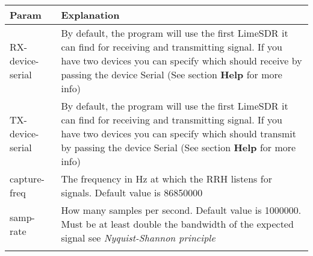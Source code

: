 \begin{longtable}[]{@{}ll@{}}
\toprule
\begin{minipage}[b]{0.18\columnwidth}\raggedright\strut
Param\strut
\end{minipage} & \begin{minipage}[b]{0.18\columnwidth}\raggedright\strut
Explanation\strut
\end{minipage}\tabularnewline
\midrule
\endhead
\begin{minipage}[t]{0.18\columnwidth}\raggedright\strut
RX-device-serial\strut
\end{minipage} & \begin{minipage}[t]{0.18\columnwidth}\raggedright\strut
By default, the program will use the first LimeSDR it can find for
receiving and transmitting signal. If you have two devices you can
specify which should receive by passing the device Serial (See section
\textbf{Help} for more info)\strut
\end{minipage}\tabularnewline
\begin{minipage}[t]{0.18\columnwidth}\raggedright\strut
TX-device-serial\strut
\end{minipage} & \begin{minipage}[t]{0.18\columnwidth}\raggedright\strut
By default, the program will use the first LimeSDR it can find for
receiving and transmitting signal. If you have two devices you can
specify which should transmit by passing the device Serial (See section
\textbf{Help} for more info)\strut
\end{minipage}\tabularnewline
\begin{minipage}[t]{0.18\columnwidth}\raggedright\strut
capture-freq\strut
\end{minipage} & \begin{minipage}[t]{0.18\columnwidth}\raggedright\strut
The frequency in Hz at which the RRH listens for signals. Default value
is 86850000\strut
\end{minipage}\tabularnewline
\begin{minipage}[t]{0.18\columnwidth}\raggedright\strut
samp-rate\strut
\end{minipage} & \begin{minipage}[t]{0.18\columnwidth}\raggedright\strut
How many samples per second. Default value is 1000000. Must be at least
double the bandwidth of the expected signal see \emph{Nyquist-Shannon
principle}\strut
\end{minipage}\tabularnewline
\begin{minipage}[t]{0.18\columnwidth}\raggedright\strut

\end{minipage}
\end{longtable}
